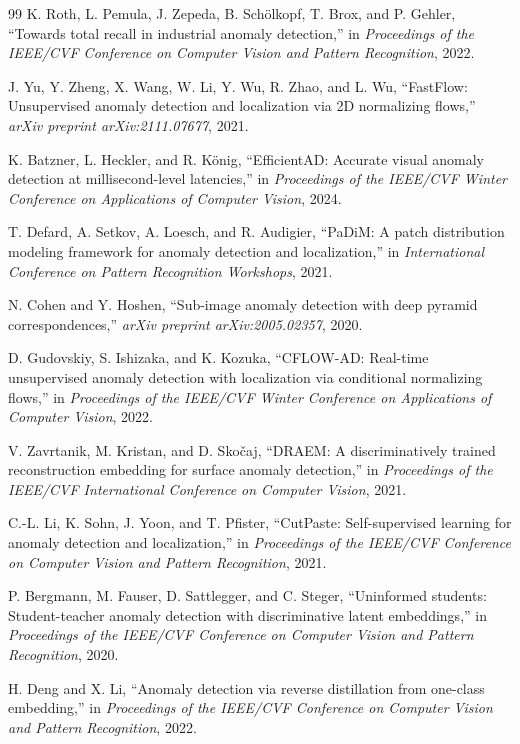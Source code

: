 \documentclass[10pt,conference]{IEEEtran}
\begin{document}
\begin{thebibliography}{99}
K. Roth, L. Pemula, J. Zepeda, B. Sch\"olkopf, T. Brox, and P. Gehler,
``Towards total recall in industrial anomaly detection,'' in
\emph{Proceedings of the IEEE/CVF Conference on Computer Vision and Pattern
Recognition}, 2022.

J. Yu, Y. Zheng, X. Wang, W. Li, Y. Wu, R. Zhao, and L. Wu, ``FastFlow:
Unsupervised anomaly detection and localization via 2D normalizing flows,''
\emph{arXiv preprint arXiv:2111.07677}, 2021.

K. Batzner, L. Heckler, and R. K\"onig, ``EfficientAD: Accurate visual
anomaly detection at millisecond-level latencies,'' in \emph{Proceedings of
the IEEE/CVF Winter Conference on Applications of Computer Vision}, 2024.

T. Defard, A. Setkov, A. Loesch, and R. Audigier, ``PaDiM: A patch
distribution modeling framework for anomaly detection and localization,''
in \emph{International Conference on Pattern Recognition Workshops}, 2021.

N. Cohen and Y. Hoshen, ``Sub-image anomaly detection with deep pyramid
correspondences,'' \emph{arXiv preprint arXiv:2005.02357}, 2020.

D. Gudovskiy, S. Ishizaka, and K. Kozuka, ``CFLOW-AD: Real-time
unsupervised anomaly detection with localization via conditional
normalizing flows,'' in \emph{Proceedings of the IEEE/CVF Winter Conference
on Applications of Computer Vision}, 2022.

V. Zavrtanik, M. Kristan, and D. Sko\v{c}aj, ``DRAEM: A discriminatively
trained reconstruction embedding for surface anomaly detection,'' in
\emph{Proceedings of the IEEE/CVF International Conference on Computer
Vision}, 2021.

C.-L. Li, K. Sohn, J. Yoon, and T. Pfister, ``CutPaste: Self-supervised
learning for anomaly detection and localization,'' in \emph{Proceedings of
the IEEE/CVF Conference on Computer Vision and Pattern Recognition}, 2021.

P. Bergmann, M. Fauser, D. Sattlegger, and C. Steger, ``Uninformed
students: Student-teacher anomaly detection with discriminative latent
embeddings,'' in \emph{Proceedings of the IEEE/CVF Conference on Computer
Vision and Pattern Recognition}, 2020.

H. Deng and X. Li, ``Anomaly detection via reverse distillation from
one-class embedding,'' in \emph{Proceedings of the IEEE/CVF Conference on
Computer Vision and Pattern Recognition}, 2022.


\end{thebibliography}
\end{document}
